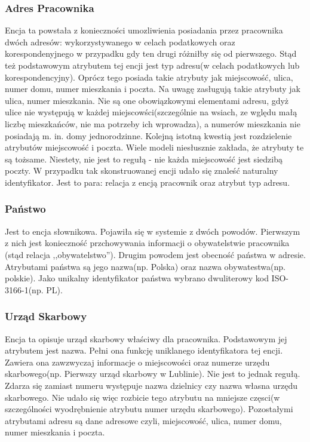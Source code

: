 \subsubsection{Adres Pracownika}
Encja ta powstała z konieczności umozliwienia posiadania przez pracownika dwóch adresów: wykorzystywanego w celach podatkowych oraz korespondenyjnego w przypadku gdy ten drugi różniłby się od pierwszego. Stąd też podstawowym atrybutem tej encji jest typ adresu(w celach podatkowych lub korespondencyjny). Oprócz tego posiada takie atrybuty jak miejscowość, ulica, numer domu, numer mieszkania i poczta. Na uwagę zasługują takie atrybuty jak ulica, numer mieszkania. Nie są one obowiązkowymi elementami adresu, gdyż ulice nie występują w każdej miejscowści(szczególnie na wsiach, ze wględu małą liczbę mieszkańców, nie ma potrzeby ich wprowadza), a numerów mieszkania nie posiadają m. in. domy jednorodzinne. Kolejną istotną kwestią jest rozdzielenie atrybutów miejscowość i poczta. Wiele modeli niesłusznie zakłada, że atrybuty te są tożsame. Niestety, nie jest to regułą - nie każda miejscowość jest siedzibą poczty.
W przypadku tak skonstruowanej encji udało się znaleść naturalny identyfikator. Jest to para: relacja z encją pracownik oraz atrybut typ adresu.

\subsubsection{Państwo}
Jest to encja słownikowa. Pojawiła się w systemie z dwóch powodów. Pierwszym z nich jest konieczność przchowywania informacji o obywatelstwie pracownika (stąd relacja ,,obywatelstwo''). Drugim powodem jest obecność państwa w adresie. Atrybutami państwa są jego nazwa(np. Polska) oraz nazwa obywatestwa(np. polskie). Jako unikalny identyfikator państwa wybrano dwuliterowy kod ISO-3166-1\cite{TODO}(np. PL).

\subsubsection{Urząd Skarbowy}
Encja ta opisuje urząd skarbowy właściwy dla pracownika. Podstawowym jej atrybutem jest nazwa. Pełni ona funkcję uniklanego identyfikatora tej encji. Zawiera ona zawzwyczaj informacje o miejscowości oraz numerze urzędu skarbowego(np. Pierwszy urząd skarbowy w Lublinie). Nie jest to jednak regułą. Zdarza się zamiast numeru występuje nazwa dzielnicy czy nazwa własna urzędu skarbowego. Nie udało się więc rozbicie tego atrybutu na mniejsze częsci(w szczególności wyodrębnienie atrybutu numer urzędu skarbowego). Pozostałymi atrybutami adresu są dane adresowe czyli, miejscowość, ulica, numer domu, numer mieszkania i poczta.

